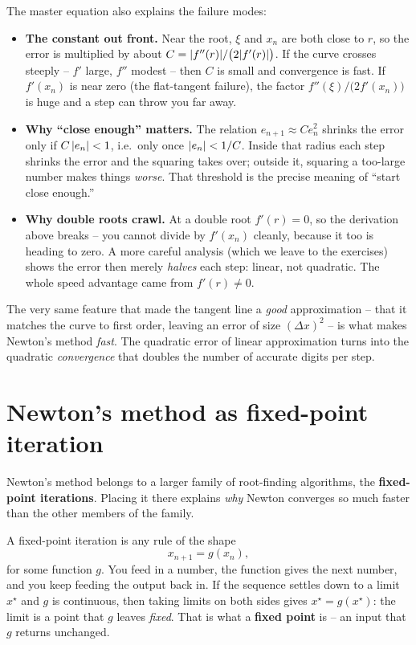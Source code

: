 The master equation also explains the failure modes:

\begin{itemize}
\item \textbf{The constant out front.} Near the root, $\xi$ and $x_n$ are both close
  to $r$, so the error is multiplied by about
  $C = \lvert f''(r)\rvert/\bigl(2\lvert f'(r)\rvert\bigr)$. If the curve crosses steeply --
  $f'$ large, $f''$ modest -- then $C$ is small and convergence is fast. If
  $f'(x_n)$ is near zero (the flat-tangent failure), the factor
  $f''(\xi)/\bigl(2f'(x_n)\bigr)$ is huge and a step can throw you far away.
\item \textbf{Why ``close enough'' matters.} The relation $e_{n+1} \approx C e_n^2$
  shrinks the error only if $C\,\lvert e_n\rvert < 1$, i.e.\ only once $\lvert e_n\rvert < 1/C$.
  Inside that radius each step shrinks the error and the squaring takes over; outside
  it, squaring a too-large number makes things \emph{worse}. That threshold is the
  precise meaning of ``start close enough.''
\item \textbf{Why double roots crawl.} At a double root $f'(r) = 0$, so the
  derivation above breaks -- you cannot divide by $f'(x_n)$ cleanly, because it too is
  heading to zero. A more careful analysis (which we leave to the exercises) shows
  the error then merely \emph{halves} each step: linear, not quadratic. The whole
  speed advantage came from $f'(r) \ne 0$.
\end{itemize}

\begin{aestheticbox}
The very same feature that made the
tangent line a \emph{good} approximation -- that it matches the curve to first order,
leaving an error of size $(\Delta x)^2$ -- is what makes Newton's method
\emph{fast}. The quadratic error of linear approximation
turns into the quadratic \emph{convergence} that
doubles the number of accurate digits per step.
\end{aestheticbox}

\section{Newton's method as fixed-point iteration}
\label{ch19:fixed-point}

Newton's method belongs to a larger family of root-finding algorithms, the
\textbf{fixed-point iterations}. Placing it there explains \emph{why} Newton
converges so much faster than the other members of the family.

A fixed-point iteration is any rule of the shape
\[
  x_{n+1} = g(x_n),
\]
for some function $g$. You feed in a number, the function gives the next number,
and you keep feeding the output back in. If the sequence settles down to a limit
$x^\star$ and $g$ is continuous, then taking limits on both sides gives
$x^\star = g(x^\star)$: the limit is a point that $g$ leaves \emph{fixed}. That is
what a \textbf{fixed point} is -- an input that $g$ returns unchanged.

